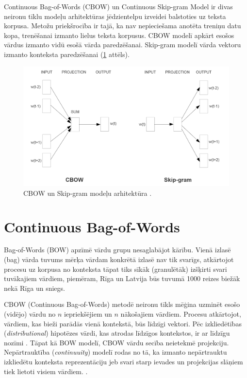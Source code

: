 Continuous Bag-of-Words (CBOW) un Continuous Skip-gram Model ir divas neironu tīklu modeļu arhitektūras jēdzientelpu izveidei balstoties uz teksta korpusa. Metožu priekšrocība ir tajā, ka nav nepieciešama anotēta treniņu datu kopa, trenēšanai izmanto lielus teksta korpusus. CBOW modelī apkārt esošos vārdus izmanto vidū esošā vārda paredzēšanai. Skip-gram modelī vārda vektoru izmanto konteksta paredzēšanai (\ref{fig:cbow-skipgram} attēls).

\begin{figure}[h]
	\centering
	\includegraphics[width=\textwidth]{figures/word2vec-models.png}
	\caption{CBOW un Skip-gram modeļu arhitektūra \cite{word2vec2013}.}
	\label{fig:cbow-skipgram}
\end{figure}







\section{Continuous Bag-of-Words}

Bag-of-Words (BOW) apzīmē vārdu grupu nesaglabājot kārību. Vienā izlasē (bag) vārda tuvums mērķa vārdam konkrētā izlasē nav tik svarīgs, atkārtojot procesu uz korpusa no konteksta tāpat tiks sīkāk (granulētāk) izšķirti svari tuvākajiem vārdiem, piemēram, Rīga un Latvija būs tuvumā 1000 reizes biežāk nekā Rīga un sniegs.

CBOW (Continuous Bag-of-Words) metodē neironu tīkls mēģina uzminēt esošo (vidējo) vārdu no $n$ iepriekšējiem un $n$ nākošajiem vārdiem. Procesu atkārtojot, vārdiem, kas bieži parādās vienā kontekstā, būs līdzīgi vektori. Pēc izkliedētības (\textit{distributional}) hipotēzes vārdi, kas atrodas līdzīgos kontekstos, ir ar līdzīgu nozīmi \cite{word2vec2013}. Tāpat kā BOW modelī, CBOW vārdu secība neietekmē projekciju. Nepārtrauktība (\textit{continuuity}) modelī rodas no tā, ka izmanto nepārtrauktu izkliedētu konteksta reprezentāciju
jeb svari starp ievades un projekcijas slāņiem tiek lietoti visiem vārdiem.
\cite{word2vec2013}.

